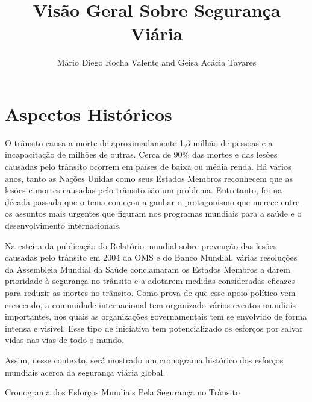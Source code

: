 \documentclass[output=paper,colorlinks,citecolor=green]{langscibook}
\title{Visão Geral Sobre Segurança Viária}
\author{Mário Diego Rocha Valente\orcid{}\affiliation{Analista de Trânsito: Estatístico} and Geisa Acácia Tavares\orcid{}\affiliation{Analista de Trânsito: Pedagogo}}
\begin{document}
\maketitle


\section{Aspectos Históricos}

O trânsito causa a morte de aproximadamente 1,3 milhão de pessoas e a incapacitação de milhões de outras. Cerca de 90\% das mortes e das lesões causadas pelo trânsito ocorrem em países de baixa ou média renda. Há vários anos, tanto as Nações Unidas como seus Estados Membros reconhecem que as lesões e mortes causadas pelo trânsito são um problema. Entretanto, foi na década passada que o tema começou a ganhar o protagonismo que merece entre os assuntos mais urgentes que figuram nos programas mundiais para a saúde e o desenvolvimento internacionais.\vskip0.3cm

Na esteira da publicação do Relatório mundial sobre prevenção das lesões causadas pelo trânsito em 2004 da OMS e do Banco Mundial, várias resoluções da Assembleia Mundial da Saúde conclamaram os Estados Membros a darem prioridade à segurança no trânsito e a adotarem medidas consideradas eﬁcazes para reduzir as mortes no trânsito. Como prova de que esse apoio político vem crescendo, a comunidade internacional tem organizado vários eventos mundiais importantes, nos quais as organizações governamentais tem se envolvido de forma intensa e visível. Esse tipo de iniciativa tem potencializado os esforços por salvar vidas nas vias de todo o mundo.\vskip0.3cm

Assim, nesse contexto, será mostrado um cronograma histórico dos esforços mundiais acerca da segurança viária global.\vskip0.3cm

\newpage
Cronograma dos Esforços Mundiais Pela Segurança no Trânsito 
\end{document}
